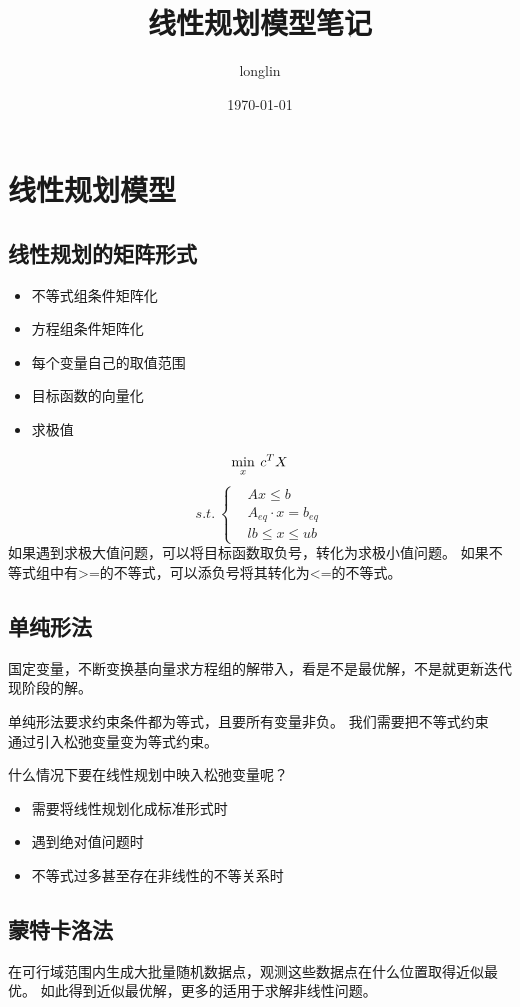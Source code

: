 \documentclass[12pt,a4paper]{article}
\title{线性规划模型笔记}
\author{longlin}
\date{\today}
\begin{document}
\maketitle

\section{线性规划模型}
\subsection{线性规划的矩阵形式}
\begin{itemize}
    \item 不等式组条件矩阵化
    \item 方程组条件矩阵化
    \item 每个变量自己的取值范围
    \item 目标函数的向量化
    \item 求极值
\end{itemize}

$$
\min_x \: c^T X \\
$$
\begin{equation}
    s.t. \:
    \begin{cases}
        & Ax \leq b \\
        & A_{eq} \cdot x = b_{eq} \\
        & lb \leq x \leq ub
    \end{cases}
\end{equation}
如果遇到求极大值问题，可以将目标函数取负号，转化为求极小值问题。
如果不等式组中有>=的不等式，可以添负号将其转化为<=的不等式。

\subsection{单纯形法}
国定变量，不断变换基向量求方程组的解带入，看是不是最优解，不是就更新迭代现阶段的解。

单纯形法要求约束条件都为等式，且要所有变量非负。
我们需要把不等式约束$\textbf{通过引入松弛变量变为等式约束}$。

什么情况下要在线性规划中映入松弛变量呢？
\begin{itemize}
    \item 需要将线性规划化成标准形式时
    \item 遇到绝对值问题时
    \item 不等式过多甚至存在非线性的不等关系时
\end{itemize}
\subsection{蒙特卡洛法}
在$\textbf{可行域范围内生成大批量随机数据点}$，观测这些数据点在什么位置取得近似最优。
如此得到近似最优解，更多的适用于求解非线性问题。
\end{document}
